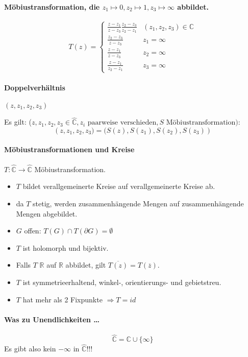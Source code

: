 \documentclass[a4paper, 10pt, DIV20, headings=small]{scrartcl}
\theoremstyle{definition}
\theoremstyle{plain}
\begin{document}
\paragraph{Möbiustransformation, die $z_1 \mapsto 0, z_2 \mapsto 1, z_3 \mapsto \infty $ abbildet.}
$$T(z) = \begin{cases} \frac{z-z_1}{z-z_3} \frac{z_2-z_3}{z_2-z_1} & (z_1,z_2,z_3) \in \mathbb{C} \\
\frac{z_2-z_3}{z-z_3} & z_1 = \infty \\
\frac{z-z_1}{z-z_3} & z_2 = \infty \\
\frac{z-z_1}{z_2-z_1} & z_3 = \infty \end{cases}$$

\paragraph{Doppelverhältnis} $(z,z_1,z_2,z_3)$

Es gilt: ($z,z_1,z_2,z_3 \in \widehat{\mathbb{C}}, z_i \text{ paarweise verschieden}, S \text{ Möbiustransformation}):$ 
$$\left(z, z_1 , z_2 , z_3 ) = (S(z), S(z_1 ), S(z_2 ), S(z_3 )\right)$$


\paragraph{Möbiustransformationen und Kreise}
$T \colon \widehat{\mathbb{C}} \rightarrow \widehat{\mathbb{C}}$ Möbiustransformation.
\begin{itemize}
	\item $T$ bildet verallgemeinerte Kreise auf verallgemeinerte Kreise ab.
	\item da $T$ stetig, werden zusammenhängende Mengen auf zusammenhängende Mengen abgebildet.
	\item $G$ offen: $T(G) \cap T(\partial G) = \emptyset$
	\item $T$ ist holomorph und bijektiv.
	\item Falls $T$ $\mathbb{R}$ auf $\mathbb{R}$ abbildet, gilt $\overline{T(z)} = T(\overline{z})$.
	\item $T$ ist symmetrieerhaltend, winkel-, orientierungs- und gebietstreu.
	\item $T$ hat mehr als 2 Fixpunkte $\Rightarrow T = id$
\end{itemize}

\paragraph{Was zu Unendlichkeiten \ldots}
$$\widehat{\mathbb{C}} = \mathbb{C} \cup \{\infty\}$$
Es gibt also kein $- \infty$ in $\widehat{\mathbb{C}}$!!!
\end{document}
